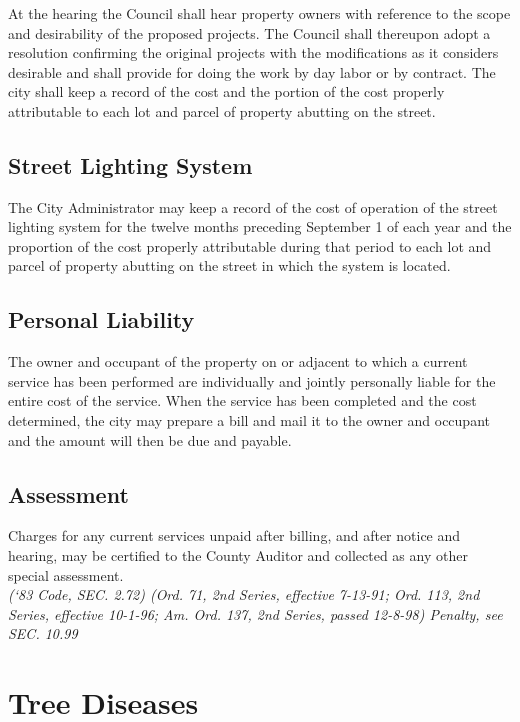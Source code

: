 \documentclass[code.tex]{subfiles}
\begin{document}
\subsubsection{}
At the hearing the Council shall hear property owners with reference to the scope and desirability of the proposed projects.  The Council shall thereupon adopt a resolution confirming the original projects with the modifications as it considers desirable and shall provide for doing the work by day labor or by contract.  The city shall keep a record of the cost and the portion of the cost properly attributable to each lot and parcel of property abutting on the street.
\subsection{Street Lighting System}
The City Administrator may keep a record of the cost of operation of the street lighting system for the twelve months preceding September 1 of each year and the proportion of the cost properly attributable during that period to each lot and parcel of property abutting on the street in which the system is located.
\subsection{Personal Liability}
The owner and occupant of the property on or adjacent to which a current service has been performed are individually and jointly personally liable for the entire cost of the service.  When the service has been completed and the cost determined, the city may prepare a bill and mail it to the owner and occupant and the amount will then be due and payable.
\subsection{Assessment}
Charges for any current services unpaid after billing, and after notice and hearing, may be certified to the County Auditor and collected as any other special assessment.\\
\emph{(‘83 Code, SEC. 2.72)  (Ord. 71, 2nd Series, effective 7-13-91; Ord. 113, 2nd Series, effective 10-1-96; Am. Ord. 137, 2nd Series, passed 12-8-98)  Penalty, see SEC. 10.99}

\section{Tree Diseases}
\end{document}
